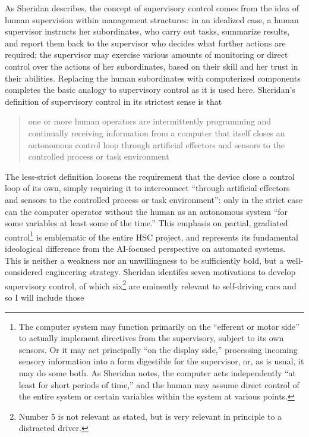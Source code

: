 As Sheridan describes, the concept of
supervisory control comes from
the idea of human supervision within management structures:  in an idealized
case, a human
supervisor instructs her subordinates, who carry out tasks, summarize
results, and report them back to the supervisor who decides what
further actions are required; the supervisor may
exercise various amounts of monitoring or direct control over the
actions of her subordinates, based on their skill and her trust in
their abilities. Replacing the human subordinates with computerized
components completes the basic analogy to supervisory control as it is
used here. Sheridan's definition of supervisory control in its
strictest sense is that
\begin{quote}one or more human operators are intermittently
  programming and continually receiving information from a computer
  that itself closes an autonomous control loop through artificial
  effectors and sensors to the controlled process or task
  environment\cite[p. 1]{sheridan}\end{quote}
The less-strict definition loosens the requirement that the device
close a control loop of its own, simply requiring it to interconnect
``through artificial effectors and sensors to the controlled process
or task environment'':  only in the strict case can the computer
operator without the human as an autonomous system ``for some
variables at least some of the time.''\cite[p. 1]{sheridan} This
emphasis on partial, gradiated control\footnote{The computer system
  may function primarily on the ``efferent or motor side'' to actually
implement directives from the supervisory, subject to its own
sensors.\cite[p. 3]{sheridan} Or it may act principally ``on the
display side,'' processing incoming sensory information into a form
digestible for the supervisor, or, as is usual, it may do some
both.\cite[p. 3]{sheridan} As Sheridan notes, the computer acts
independently ``at least for short periods of time,'' and the human
may assume direct control of the entire system or certain variables
within the system at various points.\cite[p. 3]{sheridan}} is emblematic of the entire HSC
project, and represents its fundamental ideological difference from
the AI-focused perspective on automated systems. This is neither a
weakness nor an unwillingness to be sufficiently bold, but a
well-considered engineering strategy. Sheridan identifes seven
motivations to develop supervisory control, of which
six\footnote{Number 5 is not relevant as stated, but is very relevant
  in principle to a distracted driver.} are
eminently relevant to self-driving cars and so I will include those
